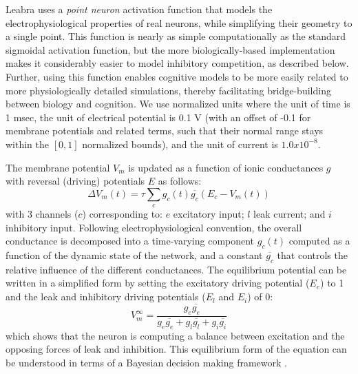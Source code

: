 \documentclass[11pt,twoside]{article}
\newif\myifpdf
\begin{document}
Leabra uses a {\em point neuron} activation function that models the electrophysiological properties of real neurons, while simplifying their geometry to a single point. This function is nearly as simple computationally as the standard sigmoidal activation function, but the more biologically-based implementation makes it considerably easier to model inhibitory competition, as described below. Further, using this function enables cognitive models to be more easily related to more physiologically detailed simulations, thereby facilitating bridge-building between biology and cognition. We use normalized units where the unit of time is 1 msec, the unit of electrical potential is 0.1 V (with an offset of -0.1 for membrane potentials and related terms, such that their normal range stays within the $[0, 1]$ normalized bounds), and the unit of current is $1.0x10^{-8}$.

The membrane potential $V_m$ is updated as a function of ionic conductances $g$ with reversal (driving) potentials $E$ as follows:
\begin{equation}
 \Delta V_m(t) = \tau \sum_c g_c(t) \overline{g_c} (E_c - V_m(t))
 \label{eq.vm}
\end{equation}
with 3 channels ($c$) corresponding to: $e$ excitatory input; $l$ leak current; and $i$ inhibitory input. Following electrophysiological convention, the overall conductance is decomposed into a time-varying component $g_c(t)$ computed as a function of the dynamic state of the network, and a constant $\overline{g_c}$ that controls the relative influence of the different conductances. The equilibrium potential can be written in a simplified form by setting the excitatory driving potential ($E_e$) to 1 and the leak and inhibitory driving potentials ($E_l$ and $E_i$) of 0:
\begin{equation}
 V_m^\infty = \frac{g_e \overline{g_e}} {g_e
  \overline{g_e} + g_l \overline{g_l} + g_i \overline{g_i}} 
\end{equation}
which shows that the neuron is computing a balance between excitation and the opposing forces of leak and inhibition. This equilibrium form of the equation can be understood in terms of a Bayesian decision making framework \cite{OReillyMunakata00}.
\end{document}
